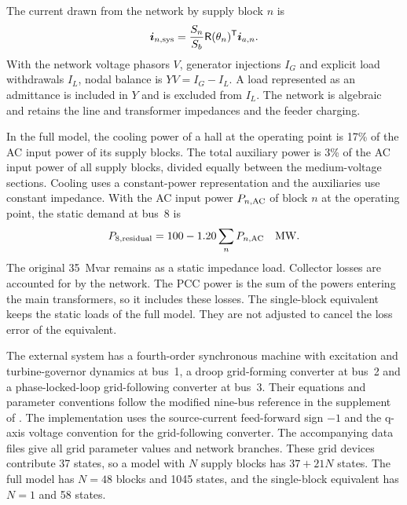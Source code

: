 The current drawn from the network by supply block $n$ is
\begin{equation}
\bm i_{n,\rm sys}=\frac{S_n}{S_b}\mathsf R(\theta_n)^{\mathsf T}\bm i_{a,n}.
\end{equation}
With the network voltage phasors $V$, generator injections $I_G$ and explicit load withdrawals $I_L$, nodal balance is $YV=I_G-I_L$.
A load represented as an admittance is included in $Y$ and is excluded from $I_L$.
The network is algebraic and retains the line and transformer impedances and the feeder charging.

In the full model, the cooling power of a hall at the operating point is 17\% of the AC input power of its supply blocks.
The total auxiliary power is 3\% of the AC input power of all supply blocks, divided equally between the medium-voltage sections.
Cooling uses a constant-power representation and the auxiliaries use constant impedance.
With the AC input power $P_{n,\rm AC}$ of block $n$ at the operating point, the static demand at bus~8 is
\begin{equation}
P_{8,\rm residual}=100-1.20\sum_n P_{n,\rm AC}\quad\mathrm{MW}.
\end{equation}
The original 35~Mvar remains as a static impedance load.
Collector losses are accounted for by the network.
The PCC power is the sum of the powers entering the main transformers, so it includes these losses.
The single-block equivalent keeps the static loads of the full model.
They are not adjusted to cancel the loss error of the equivalent.

The external system has a fourth-order synchronous machine with excitation and turbine-governor dynamics at bus~1, a droop grid-forming converter at bus~2 and a phase-locked-loop grid-following converter at bus~3.
Their equations and parameter conventions follow the modified nine-bus reference in the supplement of \cite{zhao2026dynamic}.
The implementation uses the source-current feed-forward sign $-1$ and the q-axis voltage convention for the grid-following converter.
The accompanying data files give all grid parameter values and network branches.
These grid devices contribute 37 states, so a model with $N$ supply blocks has $37+21N$ states.
The full model has $N=48$ blocks and 1045 states, and the single-block equivalent has $N=1$ and 58 states.
